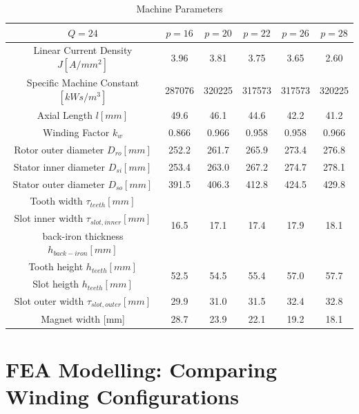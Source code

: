 \documentclass [a4 paper, 11pt, titlepage] {article}
\begin{document}
\begin{table}[h]
\begin{center}
\begin{tabular}{c|c|c|c|c|c}
				\hline\hline
				$Q=24$ & $p=16$ & $p=20$ & $p=22$ & $p=26$ & $p=28$ \\
				\hline
				Linear Current Density $J [A/mm^2]$ & 3.96 & 3.81 & 3.75 & 3.65 & 2.60 \\
				Specific Machine Constant $[kWs/m^3]$ & 287076 & 320225 & 317573 & 317573 & 320225 \\
				Axial Length $l [mm]$ & 49.6 & 46.1 & 44.6 & 42.2 & 41.2 \\
				Winding Factor $k_w$ & 0.866 & 0.966 & 0.958 & 0.958 & 0.966 \\
				Rotor outer diameter $D_{ro} [mm]$ & 252.2 & 261.7 & 265.9 & 273.4 & 276.8 \\
				Stator inner diameter $D_{si} [mm]$ & 253.4 & 263.0 & 267.2 & 274.7 & 278.1 \\
				Stator outer diameter $D_{so} [mm]$ & 391.5 & 406.3 & 412.8 & 424.5 & 429.8 \\
				Tooth width $\tau_{teeth} [mm]$ & \multirow{3}{4em}{16.5} & \multirow{3}{4em}{17.1} & \multirow{3}{4em}{17.4} & \multirow{3}{4em}{17.9} & \multirow{3}{4em}{18.1} \\
				Slot inner width $\tau_{slot,inner} [mm]$ & & & & & \\
				back-iron thickness $h_{back-iron} [mm]$ & & & & & \\
				Tooth height $h_{teeth} [mm]$ & \multirow{2}{4em}{52.5} & \multirow{2}{4em}{54.5} & \multirow{2}{4em}{55.4} & \multirow{2}{4em}{57.0} & \multirow{2}{4em}{57.7} \\
				Slot heigth $h_{teeth} [mm]$ &  &  &  &  & \\
				Slot outer width $\tau_{slot,outer} [mm]$ & 29.9 & 31.0 & 31.5 & 32.4 & 32.8 \\
				Magnet width [mm] & 28.7 & 23.9 & 	22.1 & 19.2 & 18.1 \\
			\end{tabular}
		\end{center}
		\caption{Machine Parameters}
		\label{tab:EMparameters}
	\end{table}
	
	
	
	
	\section{FEA Modelling: Comparing Winding Configurations}
		
\end{document}
